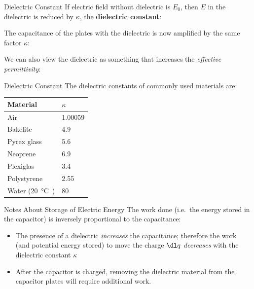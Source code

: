 \documentclass[12pt,aspectratio=169]{beamer}
\begin{document}
\begin{frame}{Dielectric Constant}
  If electric field without dielectric is $E_0$, then $E$ in the dielectric is
  reduced by $\kappa$, the \textbf{dielectric constant}:


  The capacitance of the plates with the dielectric is now amplified by the
  same factor $\kappa$:


  We can also view the dielectric as something that increases the
  \emph{effective permittivity}:
  
\end{frame}



\begin{frame}{Dielectric Constant}
  The dielectric constants of commonly used materials are:
  \begin{center}
    \begin{tabular}{l|l}
      \rowcolor{pink}
      \textbf{Material} & $\kappa$ \\ \hline
      Air         & \num{1.00059} \\
      Bakelite    & \num{4.9} \\
      Pyrex glass & \num{5.6} \\
      Neoprene    & \num{6.9} \\
      Plexiglas   & \num{3.4} \\
      Polystyrene & \num{2.55} \\
      Water (\SI{20}\celsius) & \num{80} 
    \end{tabular}
  \end{center}
\end{frame}



\begin{frame}{Notes About Storage of Electric Energy}
  The work done (i.e.\ the energy stored in the capacitor) is inversely
  proportional to the capacitance:


  \begin{itemize}
  \item The presence of a dielectric \emph{increases} the capacitance; therefore
    the work (and potential energy stored) to move the charge $\dl q$
    \emph{decreases} with the dielectric constant $\kappa$
  \item After the capacitor is charged, removing the dielectric material from
    the capacitor plates will require additional work.
  \end{itemize}
\end{frame}
\end{document}
